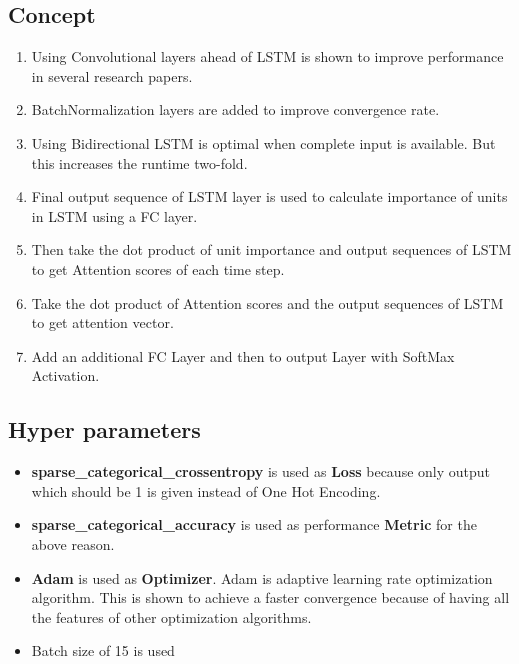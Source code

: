 \documentclass[11pt,english]{article}
\begin{document}
\subsection{Concept}
\begin{enumerate}
    \item Using Convolutional layers ahead of LSTM is shown to improve performance in several research papers.
    \item BatchNormalization layers are added to improve convergence rate.
    \item Using Bidirectional LSTM is optimal when complete input is available. But this increases the runtime two-fold.
    \item Final output sequence of LSTM layer is used to calculate importance of units in LSTM using a FC layer.
    \item Then take the dot product of unit importance and output sequences of LSTM to get Attention scores of each time step.
    \item Take the dot product of Attention scores and the output sequences of LSTM to get attention vector.
    \item Add an additional FC Layer and then to output Layer with SoftMax Activation.
\end{enumerate}

\subsection{Hyper parameters}
\begin{itemize}
    \item \textbf{sparse\_categorical\_crossentropy} is used as \textbf{Loss} because only output which should be 1 is given instead of One Hot Encoding.
    \item \textbf{sparse\_categorical\_accuracy} is used as performance \textbf{Metric} for the above reason.
    \item \textbf{Adam} is used as \textbf{Optimizer}. Adam is adaptive learning rate optimization algorithm. This is shown to achieve a faster convergence because of having all the features of other optimization algorithms.
    \item Batch size of 15 is used
\end{itemize}
\end{document}
